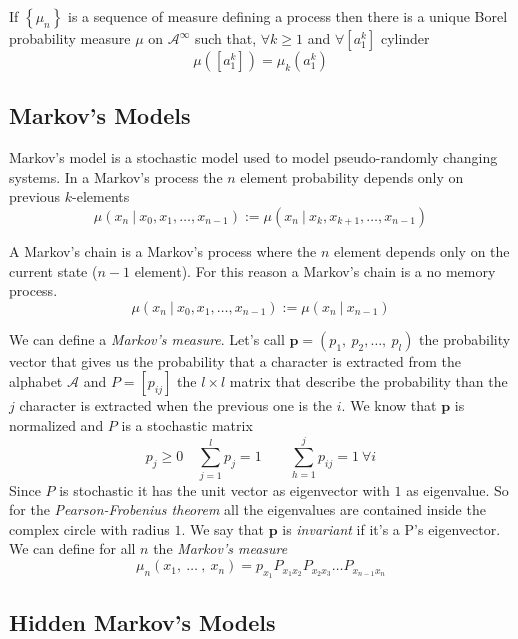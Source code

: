 \begin{theorem}
    If $\left\{\mu_n\right\}$ is a sequence of measure defining a process then there is a unique Borel probability measure $\mu$ on $\mathcal{A}^\infty$ such that, $\forall k \geq 1$ and $\forall \left[a_1^k\right]$ cylinder
    \begin{equation*}
        \mu\left(\left[a_1^k\right]\right) = \mu_k\left(a_1^k\right)
    \end{equation*}
\end{theorem}

\subsection{Markov's Models}
Markov's model is a stochastic model used to model pseudo-randomly changing systems.
In a Markov's process the $n$ element probability depends only on previous $k$-elements
\begin{equation*}
\mu\left(x_{n}\ \vert\ x_{0}, x_{1}, \dots, x_{n-1}\right):=\mu\left(x_{n}\ \vert\ x_{k}, x_{k+1}, \dots, x_{n-1}\right)
\end{equation*}

A Markov's chain is a Markov's process where the $n$ element depends only on the current state ($n-1$ element).
For this reason a Markov's chain is a no memory process.
\begin{equation*}
\mu\left(x_{n}\ \vert\ x_{0}, x_{1}, \dots, x_{n-1}\right):=\mu\left(x_{n}\ \vert\ x_{n-1}\right)
\end{equation*}

We can define a \emph{Markov's measure}.
Let's call $\mathbf{p}=\left(p_{1},\ p_{2},\dots ,\ p_{l}\right)$ the probability vector that gives us the probability that a character is extracted from the alphabet $\mathcal{A}$ and $P=\left[p_{ij}\right]$ the $l\times l$ matrix that describe the probability than the $j$ character is extracted when the previous one is the $i$.
We know that $\mathbf{p}$ is normalized and $P$ is a stochastic matrix
\[p_{j}\geq 0\quad \sum_{j=1}^{l}p_{j}=1\qquad\sum_{h=1}^{j}p_{ij}=1\ \forall i\]
Since $P$ is stochastic it has the unit vector as eigenvector with $1$ as eigenvalue.
So for the \emph{Pearson-Frobenius theorem} all the eigenvalues are contained inside the complex circle with radius $1$.
We say that $\mathbf{p}$ is \emph{invariant} if it's a P's eigenvector. We can define for all $n$ the \emph{Markov's measure}
\begin{equation*}
    \mu_{n}\left(x_{1},\ \dots\ ,\ x_{n}\right)=p_{x_{1}}P_{x_{1}x_{2}}P_{x_{2}x_{3}}\ldots P_{x_{n-1}x_{n}}
\end{equation*}


\subsection{Hidden Markov's Models}